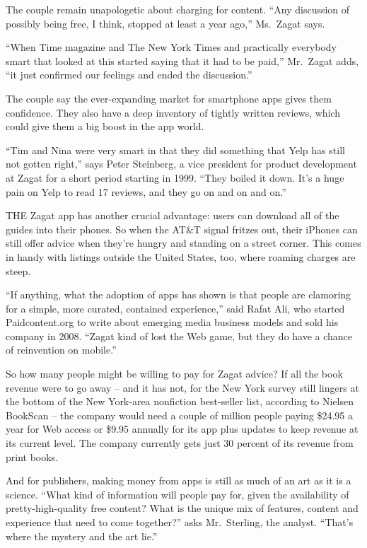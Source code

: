 ﻿\documentclass[12pt]{article}
\begin{document}
The couple remain unapologetic about charging for content. ``Any discussion of possibly being free,
I think, stopped at least a year ago,'' Ms.~Zagat says.

``When Time magazine and The New York Times and practically everybody smart that looked at this
started saying that it had to be paid,'' Mr.~Zagat adds, ``it just confirmed our feelings and ended
the discussion.''

The couple say the ever-expanding market for smartphone apps gives them confidence. They also have a
deep inventory of tightly written reviews, which could give them a big boost in the app world.

``Tim and Nina were very smart in that they did something that Yelp has still not gotten right,''
says Peter Steinberg, a vice president for product development at Zagat for a short period starting
in 1999. ``They boiled it down. It's a huge pain on Yelp to read 17 reviews, and they go on and on
and on.''

THE Zagat app has another crucial advantage: users can download all of the guides into their phones.
So when the AT\&T signal fritzes out, their iPhones can still offer advice when they're hungry and
standing on a street corner. This comes in handy with listings outside the United States, too, where
roaming charges are steep.

``If anything, what the adoption of apps has shown is that people are clamoring for a simple, more
curated, contained experience,'' said Rafat Ali, who started Paidcontent.org to write about emerging
media business models and sold his company in 2008. ``Zagat kind of lost the Web game, but they do
have a chance of reinvention on mobile.''

So how many people might be willing to pay for Zagat advice? If all the book revenue were to go away
-- and it has not, for the New York survey still lingers at the bottom of the New York-area
nonfiction best-seller list, according to Nielsen BookScan -- the company would need a couple of
million people paying \$24.95 a year for Web access or \$9.95 annually for its app plus updates to
keep revenue at its current level. The company currently gets just 30 percent of its revenue from
print books.

And for publishers, making money from apps is still as much of an art as it is a science. ``What
kind of information will people pay for, given the availability of pretty-high-quality free content?
What is the unique mix of features, content and experience that need to come together?'' asks
Mr.~Sterling, the analyst. ``That's where the mystery and the art lie.''
\end{document}
